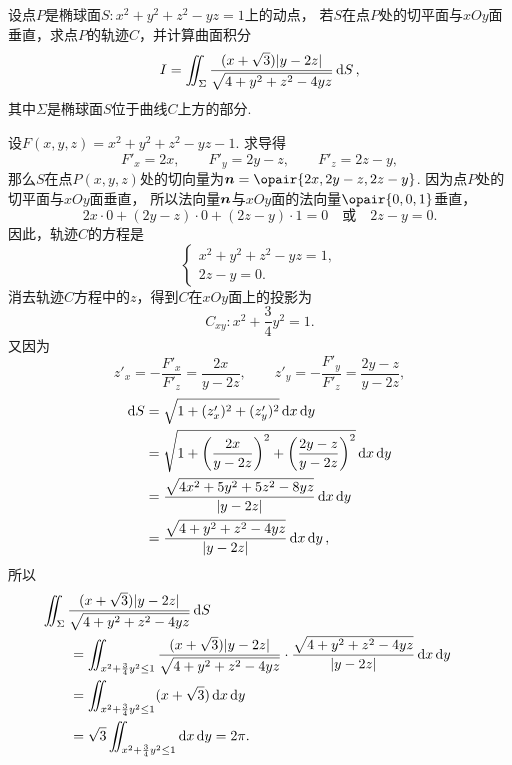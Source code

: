 \begin{example}
设点\(P\)是椭球面\(S: x^2 + y^2 + z^2 - yz = 1\)上的动点，
若\(S\)在点\(P\)处的切平面与\(xOy\)面垂直，求点\(P\)的轨迹\(C\)，并计算曲面积分\[
	I = \iint_\Sigma \frac{(x+\sqrt{3}) \abs{y-2z}}{\sqrt{4+y^2+z^2-4yz}} \dd{S},
\]
其中\(\Sigma\)是椭球面\(S\)位于曲线\(C\)上方的部分.
\begin{solution}
设\(F(x,y,z) = x^2 + y^2 + z^2 - yz - 1\).
求导得\[
	F'_x = 2x, \qquad
	F'_y = 2y - z, \qquad
	F'_z = 2z - y,
\]
那么\(S\)在点\(P(x,y,z)\)处的切向量为\(\vb{n} = \opair{2x,2y-z,2z-y}\).
因为点\(P\)处的切平面与\(xOy\)面垂直，
所以法向量\(\boldsymbol{n}\)与\(xOy\)面的法向量\(\opair{0,0,1}\)垂直，\[
	2x\cdot0 + (2y-z)\cdot0+(2z-y)\cdot1=0
	\quad\text{或}\quad
	2z-y=0.
\]
因此，轨迹\(C\)的方程是\[
	\begin{cases}
		x^2 + y^2 + z^2 - yz = 1, \\
		2z-y=0.
	\end{cases}
\]
消去轨迹\(C\)方程中的\(z\)，得到\(C\)在\(xOy\)面上的投影为\[
	C_{xy}: x^2+\frac{3}{4}y^2=1.
\]
又因为\[
	z'_x = - \frac{F'_x}{F'_z} = \frac{2x}{y-2z}, \qquad
	z'_y = - \frac{F'_y}{F'_z} = \frac{2y-z}{y-2z},
\]
\begin{align*}
	\dd{S} &= \sqrt{1+(z'_x)^2+(z'_y)^2} \dd{x}\dd{y} \\
	&= \sqrt{1+\left(\frac{2x}{y-2z}\right)^2+\left(\frac{2y-z}{y-2z}\right)^2} \dd{x}\dd{y} \\
	&= \frac{\sqrt{4x^2+5y^2+5z^2-8yz}}{\abs{y-2z}} \dd{x}\dd{y} \\
	&= \frac{\sqrt{4+y^2+z^2-4yz}}{\abs{y-2z}} \dd{x}\dd{y},
\end{align*}
所以\begin{align*}
	&\hspace{-20pt}
	\iint_\Sigma \frac{(x+\sqrt{3}) \abs{y-2z}}{\sqrt{4+y^2+z^2-4yz}} \dd{S} \\
	&= \iint_{x^2+\frac{3}{4}y^2\leq1} \frac{(x+\sqrt{3}) \abs{y-2z}}{\sqrt{4+y^2+z^2-4yz}}
		\cdot \frac{\sqrt{4+y^2+z^2-4yz}}{\abs{y-2z}} \dd{x}\dd{y} \\
	&= \iint_{x^2+\frac{3}{4}y^2\leq1} (x+\sqrt{3}) \dd{x}\dd{y} \\
	&= \sqrt{3} \iint_{x^2+\frac{3}{4}y^2\leq1} \dd{x}\dd{y}
	= 2\pi.
\end{align*}
\end{solution}
\end{example}

